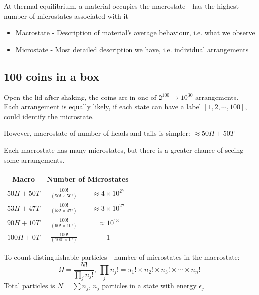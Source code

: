 \documentclass[a4paper, 11pt, normalem]{report}
\begin{document}
At thermal equilibrium, a material occupies the macrostate - has the highest number of microstates associated with it.
\begin{itemize}
    \item Macrostate - Description of material's average behaviour, i.e. what we observe
    \item Microstate - Most detailed description we have, i.e. individual arrangements
\end{itemize}

\subsection{100 coins in a box}
Open the lid after shaking, the coins are in one of $2^{100} \to 10^{30}$ arrangements. \\
Each arrangement is equally likely, if each state can have a label $[1,2,\cdots,100]$, could identify the microstate.

However, macrostate of number of heads and tails is simpler: $\approx 50H + 50T$

Each macrostate has many microstates, but there is a greater chance of seeing some arrangements.
\begin{table}[H]
    \centering
    \begin{tabular}{|c|c|c|}
        \hline
        Macro & \multicolumn{2}{c|}{Number of Microstates} \\
        \hline
        $50H + 50T$ & $\frac{100!}{(50!\times50!)}$ & $\approx 4\times10^{27}$ \\
        $53H + 47T$ & $\frac{100!}{(53!\times47!)}$ & $\approx 3\times10^{27}$ \\
        $90H + 10T$ & $\frac{100!}{(90!\times10!)}$ & $\approx 10^{13}$ \\
        $100H + 0T$ & $\frac{100!}{(100!\times0!)}$ & $1$ \\
        \hline
    \end{tabular}
\end{table}
To count distinguishable particles - number of microstates in the macrostate:
\begin{equation*}
    \Omega = \frac{N!}{\prod_{j} n_j!},~ \prod_{j}n_j! = n_1!\times n_2!\times n_3!\times\cdots\times n_n!
\end{equation*}
Total particles is $N = \sum n_j$, $n_j$ particles in a state with energy $\epsilon_j$
\end{document}
